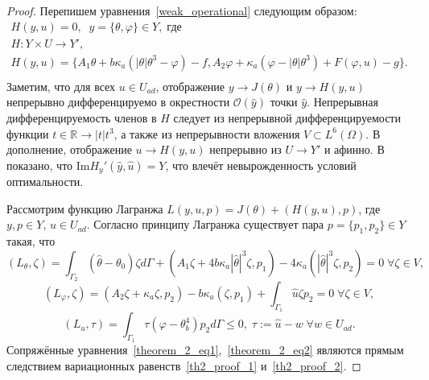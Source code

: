 \documentclass[10pt]{article}
\begin{document}
    \begin{proof}
        Перепишем уравнения~\eqref{weak_operational} следующим образом:
        \begin{gather*}
            H(y,u) = 0,\;\; y = \{\theta,\varphi\} \in Y, \; \text{где}\\
            H:Y \times U \to Y',\\
            H(y,u) =\{A_1 \theta + b \kappa_a (| \theta | \theta^3 - \varphi ) - f,
            A_2 \varphi + \kappa_a (\varphi - |\theta|\theta^3) + F(\varphi, u) - g \}.\\
        \end{gather*}
        Заметим, что для всех $u \in U_{ad}$, отображение $y \to J(\theta) $ и $y \to H(y,u)$
        непрерывно дифференцируемо в окрестности $\mathcal{O}(\hat{y})$ точки $\hat{y}$.
        Непрерывная дифференцируемость членов в $H$ следует из непрерывной дифференцируемости
        функции $t \in \mathbb{R} \to | t | t^3$, а также из непрерывности вложения
        $V \subset L^6(\Omega)$.
        В дополнение, отображение $u \to H(y,u)$ непрерывно из $U \to Y'$ и афинно.
        В~\cite{cheb_origin} показано, что $\text{Im}H_y'(\hat{y}, \hat{u}) = Y$,
        что влечёт невырожденность условий оптимальности.

        Рассмотрим функцию Лагранжа
        $L(y,u,p) = J(\theta) + (H(y,u),p)$, где $y,p \in Y,\, u \in U_{ad}$.
        Согласно принципу Лагранжа \cite[Гл.2, Теорема 1.5]{theorem_proof_18}
        существует пара $p = \{p_1,p_2\} \in Y$ такая, что
        \begin{equation}
            \label{th2_proof_1}
            (L_\theta,\zeta) =\int_{\Gamma_2}(\hat\theta -\theta_0) \zeta d\Gamma +
            (A_1 \zeta + 4b\kappa_a |\hat\theta|^3 \zeta,p_1) -
            4\kappa_a(|\hat\theta|^3 \zeta,p_2) = 0 \; \forall \zeta \in V,
        \end{equation}
        \begin{equation}
            \label{th2_proof_2}
            (L_\varphi, \zeta) = (A_2 \zeta + \kappa_a \zeta, p_2) -
            b \kappa_a(\zeta,p_1) +\int_{\Gamma_1} \hat u \zeta p_2 = 0 \; \forall \zeta \in V,
        \end{equation}
        \begin{equation}
            \label{th2_proof_3}
            (L_u,\tau) = \int_{\Gamma_1} \tau (\varphi - \theta^4_b) p_2 d\Gamma  \leq 0, \;
            \tau := \hat u - w \; \forall w \in U_{ad}.
        \end{equation}
        Сопряжённые уравнения~\eqref{theorem_2_eq1},~\eqref{theorem_2_eq2} являются прямым
        следствием вариационных равенств~\eqref{th2_proof_1} и~\eqref{th2_proof_2}.
    \end{proof}
\end{document}
